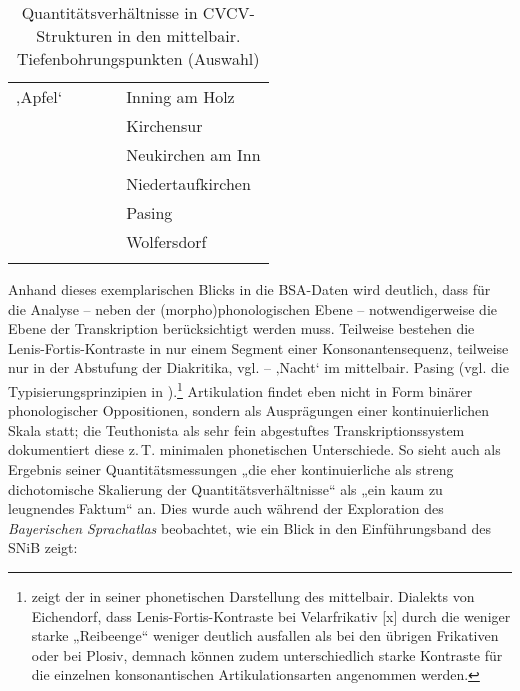 \begin{table}[p]
\begin{tabularx}{\textwidth}{llQQl}
 ‚Apfel‘ &  &  &  & Inning am Holz\\
&  &  &  & Kirchensur\\
&  &  &  & Neukirchen am Inn\\
&  &  &  & Niedertaufkirchen\\
&  &  &  & Pasing\\
&  &  &  & Wolfersdorf\\
\lspbottomrule
\end{tabularx}
\caption{Quantitätsverhältnisse in CVCV-Strukturen in den mittelbair. Tiefenbohrungspunkten (Auswahl)\label{tab:28}}
\end{table}

Anhand dieses exemplarischen Blicks in die BSA-Daten wird deutlich, dass für die Analyse -- neben der (morpho)phonologischen Ebene -- notwendigerweise die Ebene der Transkription berücksichtigt werden muss. Teilweise bestehen die Lenis-Fortis-Kontraste in nur einem Segment einer Konsonantensequenz, teilweise nur in der Abstufung der Diakritika, vgl.  --  ‚Nacht‘ im mittelbair. Pasing (vgl. die Typisierungsprinzipien in ).\footnote{\citet[13]{Schießl1909} zeigt der in seiner phonetischen Darstellung des mittelbair. Dialekts von Eichendorf, dass Lenis-Fortis-Kontraste bei Velarfrikativ [x] durch die weniger starke „Reibeenge“ weniger deutlich ausfallen als bei den übrigen Frikativen oder bei Plosiv, demnach können zudem unterschiedlich starke Kontraste für die einzelnen konsonantischen Artikulationsarten angenommen werden.} Artikulation findet eben nicht in Form binärer phonologischer Oppositionen, sondern als Ausprägungen einer kontinuierlichen Skala statt; die Teuthonista als sehr fein abgestuftes Transkriptionssystem dokumentiert diese z.\,T. minimalen phonetischen Unterschiede. So sieht auch \citet[22]{Scheutz1984} als Ergebnis seiner Quantitätsmessungen „die eher kontinuierliche als streng dichotomische Skalierung der Quantitätsverhältnisse“ als „ein kaum zu leugnendes Faktum“ an. Dies wurde auch während der Exploration des \textit{Bayerischen Sprachatlas} beobachtet, wie ein Blick in den Einführungsband des SNiB zeigt:

